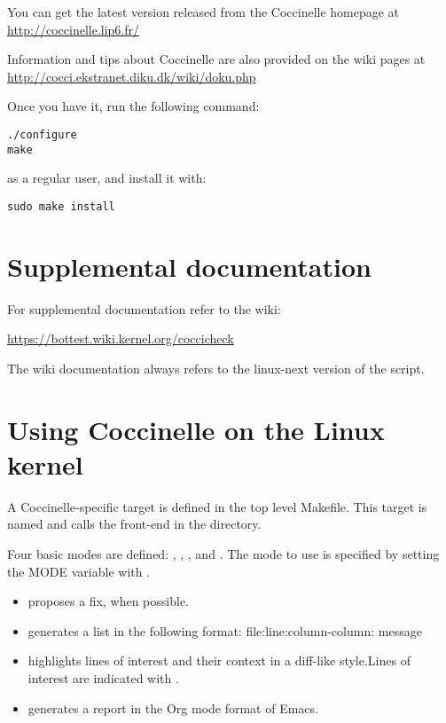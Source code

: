 \documentclass[a4paper,8pt,english]{sphinxmanual}
\begin{document}
You can get the latest version released from the Coccinelle homepage at
\url{http://coccinelle.lip6.fr/}

Information and tips about Coccinelle are also provided on the wiki
pages at \url{http://cocci.ekstranet.diku.dk/wiki/doku.php}

Once you have it, run the following command:

\begin{Verbatim}[commandchars=\\\{\}]
./configure
make
\end{Verbatim}

as a regular user, and install it with:

\begin{Verbatim}[commandchars=\\\{\}]
sudo make install
\end{Verbatim}


\section{Supplemental documentation}
\label{dev-tools/coccinelle:supplemental-documentation}
For supplemental documentation refer to the wiki:

\url{https://bottest.wiki.kernel.org/coccicheck}

The wiki documentation always refers to the linux-next version of the script.


\section{Using Coccinelle on the Linux kernel}
\label{dev-tools/coccinelle:using-coccinelle-on-the-linux-kernel}
A Coccinelle-specific target is defined in the top level
Makefile. This target is named  and calls the 
front-end in the  directory.

Four basic modes are defined: , , , and
. The mode to use is specified by setting the MODE variable with
.
\begin{itemize}
\item {} 
 proposes a fix, when possible.

\item {} 
 generates a list in the following format:
file:line:column-column: message

\item {} 
 highlights lines of interest and their context in a
diff-like style.Lines of interest are indicated with \sphinxcode{-}.

\item {} 
 generates a report in the Org mode format of Emacs.

\end{itemize}
\end{document}
